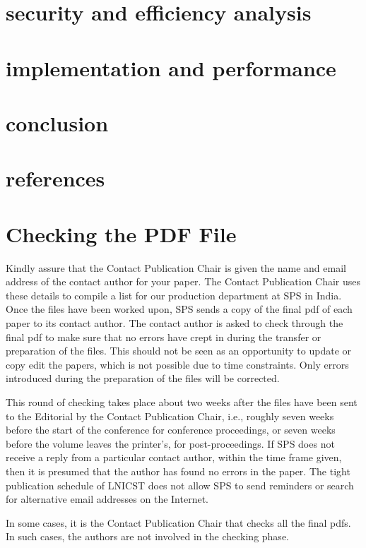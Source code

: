\documentclass[lnicst,sechang,a4paper]{svmultln}
\begin{document}
\section{security and efficiency analysis}

\section{implementation and performance}
\section{conclusion}
\section{references}

\section{Checking the PDF File}

Kindly assure that the Contact Publication Chair is given the name and email
address of the contact author for your paper. The Contact Publication Chair
uses these details to compile a list for our production department at
SPS in India. Once the files have been worked upon, SPS sends a copy of
the final pdf of each paper to its contact author. The contact author is
asked to check through the final pdf to make sure that no errors have
crept in during the transfer or preparation of the files. This should
not be seen as an opportunity to update or copy edit the papers, which is
not possible due to time constraints. Only errors introduced during the
preparation of the files will be corrected.

This round of checking takes place about two weeks after the files have
been sent to the Editorial by the Contact Publication Chair, i.e., roughly
seven weeks before the start of the conference for conference
proceedings, or seven weeks before the volume leaves the printer's, for
post-proceedings. If SPS does not receive a reply from a particular
contact author, within the time frame given, then it is presumed that the
author has found no errors in the paper. The tight publication schedule
of LNICST does not allow SPS to send reminders or search for alternative
email addresses on the Internet.

In some cases, it is the Contact Publication Chair that checks all the final
pdfs. In such cases, the authors are not involved in the checking phase.
\end{document}
